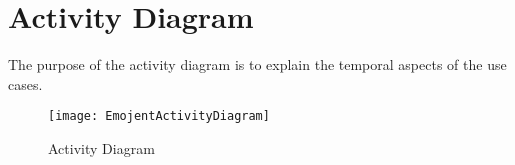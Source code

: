 \chapter{Activity Diagram}
The purpose of the activity diagram is to explain the temporal aspects of the use cases.
\begin{figure}[H]
    \centering
    \texttt{[image: EmojentActivityDiagram]}
    \caption{Activity Diagram}
    \label{fig:EmojentActivityDiagram}
\end{figure}